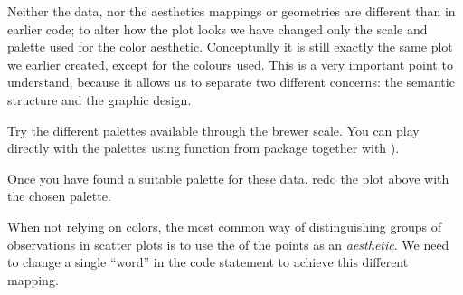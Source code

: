 \documentclass[krantz2]{krantz}\usepackage{knitr}%
\begin{document}
Neither the data, nor the aesthetics mappings or geometries are different than in earlier code; to alter how the plot looks we have changed only the scale and palette used for the color aesthetic. Conceptually it is still exactly the same plot we earlier created, except for the colours used. This is a very important point to understand, because it allows us to separate two different concerns: the semantic structure and the graphic design.

\begin{playground}
Try the different palettes available through the brewer scale. You can play directly with the palettes using function  from package  together with ).

\begin{knitrout}\footnotesize
{}\color{fgcolor}\begin{kframe}
\begin{alltt}
\hlstd{(}\hlstd{()(}\hlstd{))}
\hlstd{(}\hlstd{(} \hlstd{=} \hlstd{,}  \hlstd{=} \hlstd{,}  \hlstd{=} \hlstd{)(}\hlstd{))}
\end{alltt}
\end{kframe}
\end{knitrout}
Once you have found a suitable palette for these data, redo the plot above with the chosen palette.
\end{playground}

When not relying on colors, the most common way of distinguishing groups of observations in scatter plots is to use the  of the points as an \emph{aesthetic}. We need to change a single ``word'' in the code statement to achieve this different mapping.

\begin{knitrout}\footnotesize
{}\color{fgcolor}\begin{kframe}
\begin{alltt}
\hlstd{(}  \hlstd{(}     \hlstd{=}  \hlopt{+}
  \hlstd{()}
\end{alltt}
\end{kframe}
\end{knitrout}
\end{document}
